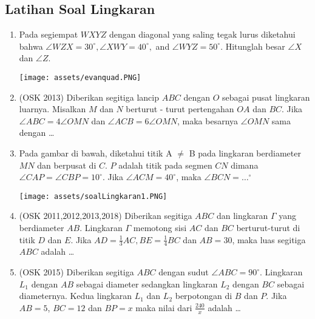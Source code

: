 \subsection{Latihan Soal Lingkaran}
\begin{enumerate}
    \item Pada segiempat $WXYZ$ dengan diagonal yang saling tegak lurus diketahui bahwa $\angle WZX = 30^\circ, \angle XWY = 40^\circ,$ and $\angle WYZ = 50^\circ$. Hitunglah besar $\angle X$ dan $\angle Z$.
    \begin{center}
        \texttt{[image: assets/evanquad.PNG]}
    \end{center}
		
    \item (OSK 2013) Diberikan segitiga lancip $ABC$ dengan $O$ sebagai pusat lingkaran luarnya. Misalkan $M$ dan $N$ berturut - turut pertengahan $OA$ dan $BC$. Jika $\angle ABC = 4\angle OMN$ dan $\angle ACB = 6\angle OMN$, maka besarnya $\angle OMN$ sama dengan \dots

    \item 	Pada gambar di bawah, diketahui titik A $\ne$ B pada lingkaran berdiameter $MN$ dan berpusat di $C$. $P$ adalah titik pada segmen $CN$ dimana $\angle CAP = \angle CBP = 10 ^\circ$. Jika $\angle ACM = 40^\circ$, maka $\angle BCN = \dots^\circ$	
    \begin{center}
         \texttt{[image: assets/soalLingkaran1.PNG]}
    \end{center}

    \item (OSK 2011,2012,2013,2018) Diberikan segitiga $ABC$ dan lingkaran $\Gamma$ yang berdiameter $AB$. Lingkaran $\Gamma$ memotong sisi $AC$ dan $BC$ berturut-turut di titik $D$ dan $E$. Jika $AD = \frac13 AC, BE =\frac14 BC$ dan $AB = 30$, maka luas segitiga $ABC$ adalah \dots

    \item (OSK 2015) Diberikan segitiga $ABC$ dengan sudut $\angle ABC = 90^\circ$. Lingkaran $L_1$ dengan $AB$ sebagai diameter sedangkan lingkaran $L_2$ dengan $BC$ sebagai diameternya. Kedua lingkaran $L_1$ dan $L_2$ berpotongan di $B$ dan $P$. Jika $AB = 5$, $BC = 12$ dan $BP = x$ maka nilai dari $\frac{240}{x}$ adalah \ldots
\end{enumerate}